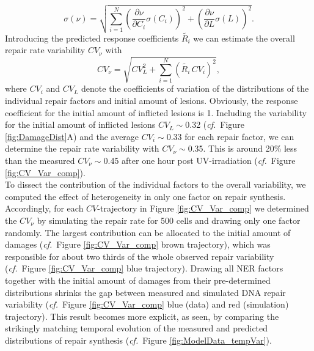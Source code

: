 \begin{equation}
\sigma(\nu) = \sqrt{\sum_{i = 1}^{N} \left(\frac{\partial \nu}{\partial C_i}\sigma(C_i) \right)^2 + \left(\frac{\partial \nu}{\partial L}\sigma(L)\right)^2 }.
\label{eqn:lawoferrorPropagation}
\end{equation} 
Introducing the predicted response coefficients $\tilde{R_i}$ we can estimate the overall repair rate variability $CV_{\nu}$ with
\begin{equation}
CV_{\nu} = \sqrt{CV_{L}^2 + \sum_{i = 1}^{N}(\tilde{R_i} \, CV_i)^2},
\label{eqn:lawOfErrorPropI}
\end{equation}
where $CV_{i}$ and $CV_L$ denote the coefficients of variation of the distributions of the individual repair factors and initial amount of lesions. Obviously, the response coefficient for the initial amount of inflicted lesions is 1. Including the variability for the initial amount of inflicted lesions $CV_L\sim$0.32 (\textit{cf.}\ Figure \ref{fig:DamageDist}A) and the average $CV_i \sim$0.33 for each repair factor, we can determine the repair rate variability with $CV_{\nu} \sim$0.35. This is around 20\% less than the measured $CV_{\nu} \sim$0.45 after one hour post UV-irradiation (\textit{cf.}\ Figure \ref{fig:CV_Var_comp}).\\
To dissect the contribution of the individual factors to the
overall variability, we computed the effect of heterogeneity in only one factor on repair synthesis. Accordingly, for each $CV$-trajectory in Figure \ref{fig:CV_Var_comp} we determined the $CV_{\nu}$ by simulating the repair rate for 500 cells and drawing only one factor randomly. The largest contribution can be allocated to the initial amount of damages (\textit{cf.}\ Figure \ref{fig:CV_Var_comp} brown trajectory), which was responsible for about two thirds of the whole observed repair variability (\textit{cf.}\ Figure \ref{fig:CV_Var_comp} blue trajectory). Drawing all NER factors together with the initial amount of damages from their pre-determined distributions shrinks the gap between measured and simulated DNA repair variability (\textit{cf.}\ Figure \ref{fig:CV_Var_comp} blue (data) and red (simulation) trajectory). This result becomes more explicit, as seen, by comparing the strikingly matching temporal evolution of the measured and predicted distributions of repair synthesis (\textit{cf.}\ Figure \ref{fig:ModelData_tempVar}).\\
